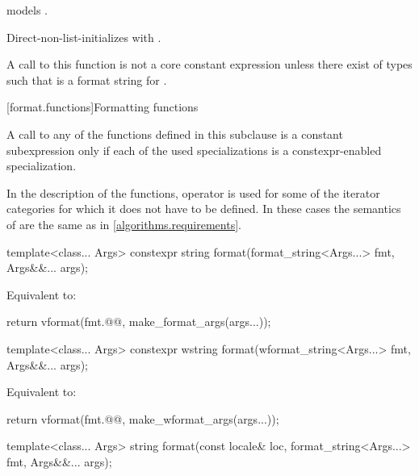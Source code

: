 \begin{itemdescr}
\pnum
\constraints
{} models .

\pnum
\effects
Direct-non-list-initializes  with .

\pnum
\remarks
A call to this function is not a core constant expression
unless there exist  of types 
such that  is a format string for .
\end{itemdescr}

[format.functions]{Formatting functions}

\pnum
A call to any of the functions defined in this subclause
is a constant subexpression only if
each of the used  specializations
is a constexpr-enabled specialization.

\pnum
In the description of the functions, operator \tcode{+} is used
for some of the iterator categories for which it does not have to be defined.
In these cases the semantics of  are
the same as in \ref{algorithms.requirements}.

%
\begin{itemdecl}
template<class... Args>
  constexpr string format(format_string<Args...> fmt, Args&&... args);
\end{itemdecl}

\begin{itemdescr}
\pnum
\effects
Equivalent to:
\begin{codeblock}
return vformat(fmt.@@, make_format_args(args...));
\end{codeblock}
\end{itemdescr}

%
\begin{itemdecl}
template<class... Args>
  constexpr wstring format(wformat_string<Args...> fmt, Args&&... args);
\end{itemdecl}

\begin{itemdescr}
\pnum
\effects
Equivalent to:
\begin{codeblock}
return vformat(fmt.@@, make_wformat_args(args...));
\end{codeblock}
\end{itemdescr}

%
\begin{itemdecl}
template<class... Args>
  string format(const locale& loc, format_string<Args...> fmt, Args&&... args);
\end{itemdecl}

